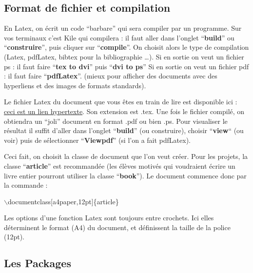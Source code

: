\documentclass[11pt]{article}
\theoremstyle{remark}
\theoremstyle{definition}
\begin{document}
\subsection{Format de fichier et compilation}


En Latex, on écrit un code ``barbare'' qui sera compiler par un programme. Sur vos terminaux c'est Kile qui compilera : il faut aller dans l'onglet ``\textbf{build}'' ou ``\textbf{construire}'', puis cliquer sur ``\textbf{compile}''. On choisit alors le type de compilation (Latex, pdfLatex, bibtex pour la bibliographie \ldots).
Si en sortie on veut un fichier ps : il faut faire ``\textbf{tex to dvi}'' puis  ``\textbf{dvi to ps}''
Si en sortie on veut un fichier pdf : il faut faire ``\textbf{pdfLatex}''. (mieux pour afficher des documents avec des hyperliens et des images de formats standards).

Le fichier Latex du document que vous êtes en train de lire est disponible ici : \href{http://josephsalmon.eu/enseignement/M1/introlatex.tex}{ceci est un lien hypertexte}.  Son extension est  .tex. Une fois le fichier compilé,  on obtiendra un ``joli'' document en format .pdf ou bien .ps. Pour visualiser le résultat il suffit d'aller dans l'onglet  ``\textbf{build}'' (ou construire), choisir ``\textbf{view}`` (ou voir) puis de sélectionner ``\textbf{Viewpdf}'' (si l'on a fait pdfLatex).\medskip

Ceci fait, on choisit la classe de document  que l'on veut créer.  Pour les projets,  la classe ``\textbf{article}'' est recommandée (les élèves motivés qui voudraient écrire un livre entier pourront utiliser la classe ``\textbf{book}''). Le document commence donc par la commande :\medskip

$\backslash$documentclass[a4paper,12pt]\{article\}\medskip

Les options d'une fonction Latex sont toujours entre crochets. Ici elles déterminent le format (A4) du document, et définissent la taille de la police (12pt).\medskip


\subsection{Les Packages}
\end{document}
